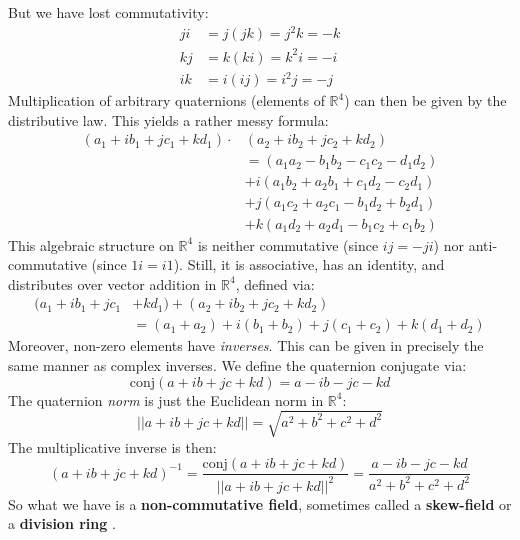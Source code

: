 \documentclass{article}
\theoremstyle{plain}
\theoremstyle{normal}
\begin{document}
       But we have lost commutativity:
        \begin{align}
            ji&=j(jk)=j^{2}k=-k\\
            kj&=k(ki)=k^{2}i=-i\\
            ik&=i(ij)=i^{2}j=-j
        \end{align}
        Multiplication of arbitrary quaternions (elements of $\mathbb{R}^{4}$)
        can then be given by the distributive law. This yields a rather
        messy formula:
        \begin{align}
            (a_{1}+ib_{1}+jc_{1}+kd_{1})\cdot&(a_{2}+ib_{2}+jc_{2}+kd_{2})
            \nonumber\\
            &=(a_{1}a_{2}-b_{1}b_{2}-c_{1}c_{2}-d_{1}d_{2})\nonumber\\
            &+i(a_{1}b_{2}+a_{2}b_{1}+c_{1}d_{2}-c_{2}d_{1})\nonumber\\
            &+j(a_{1}c_{2}+a_{2}c_{1}-b_{1}d_{2}+b_{2}d_{1})\nonumber\\
            &+k(a_{1}d_{2}+a_{2}d_{1}-b_{1}c_{2}+c_{1}b_{2})
        \end{align}
        This algebraic structure on $\mathbb{R}^{4}$ is neither commutative
        (since $ij=-ji$) nor anti-commutative (since $1i=i1$). Still, it is
        associative, has an identity, and distributes over vector addition
        in $\mathbb{R}^{4}$, defined via:
        \begin{align}
            (a_{1}+ib_{1}+jc_{1}&+kd_{1})+(a_{2}+ib_{2}+jc_{2}+kd_{2})
            \nonumber\\
            &=(a_{1}+a_{2})+i(b_{1}+b_{2})+j(c_{1}+c_{2})+k(d_{1}+d_{2})
        \end{align}
        Moreover, non-zero elements have \textit{inverses}. This can be
        given in precisely the same manner as complex inverses. We define the
        quaternion conjugate via:
        \begin{equation}
            \textrm{conj}(a+ib+jc+kd)=a-ib-jc-kd
        \end{equation}
        The quaternion \textit{norm} is just the Euclidean norm in
        $\mathbb{R}^{4}$:
        \begin{equation}
            ||a+ib+jc+kd||=\sqrt{a^{2}+b^{2}+c^{2}+d^{2}}
        \end{equation}
        The multiplicative inverse is then:
        \begin{equation}
            (a+ib+jc+kd)^{-1}
            =\frac{\textrm{conj}(a+ib+jc+kd)}{||a+ib+jc+kd||^{2}}
            =\frac{a-ib-jc-kd}{a^{2}+b^{2}+c^{2}+d^{2}}
        \end{equation}
        So what we have is a \textbf{non-commutative field}, sometimes called a
        \textbf{skew-field} or a \textbf{division ring}
        \cite[p. 4]{LamNonCommutativeRings}.
\end{document}
